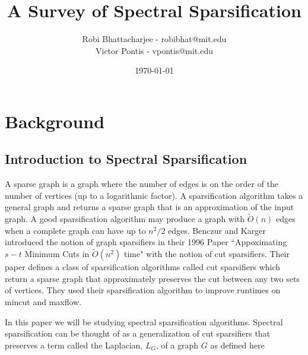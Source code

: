 \documentclass[12pt,twoside]{article}
\title{A Survey of Spectral Sparsification}
\date{\today}
\author{Robi Bhattacharjee - robibhat@mit.edu \\
        Victor Pontis - vpontis@mit.edu }
\begin{document}
\maketitle


\section{Background}

\subsection{Introduction to Spectral Sparsification}

A sparse graph is a graph where the number of edges is on the order of the number of vertices (up to a logarithmic factor). A sparsification algorithm takes a general graph and returns a sparse graph that is an approximation of the input graph. A good sparsification algorithm may produce a graph with $\tilde{O}(n)$ edges when a complete graph can have up to $n^2/2$ edges. Benczur and Karger introduced the notion of graph sparsifiers in their 1996 Paper ``Appoximating $s-t$ Minimum Cuts in $\tilde{O}(n^2)$ time" \cite{benczur-karger-mincut} with the notion of cut sparsifiers. Their paper defines a class of sparsification algorithms called cut sparsifiers which return a sparse graph that approximately preserves the cut between any two sets of vertices. They used their sparsification algorithm to improve runtimes on mincut and maxflow. 

In this paper we will be studying spectral sparsification algorithms. Spectral sparsification can be thought of as a generalization of cut sparsifiers that preserves a term called the Laplacian, $L_G$, of a graph $G$ as defined here
\end{document}
